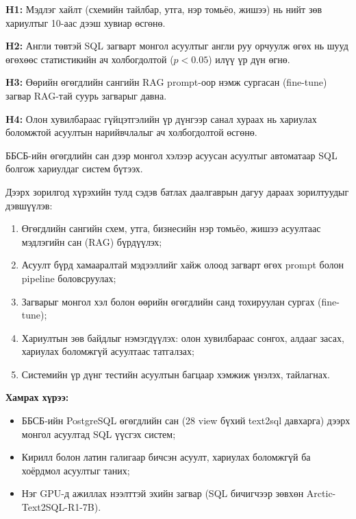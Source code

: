 \label{sec:hypothesis}

\textbf{H1:} Мэдлэг хайлт (схемийн тайлбар, утга, нэр томьёо, жишээ) нь нийт зөв хариултыг 10-аас дээш хувиар өсгөнө.

\textbf{H2:} Англи төвтэй SQL загварт монгол асуултыг англи руу орчуулж өгөх нь шууд өгөхөөс статистикийн ач
холбогдолтой ($p < 0.05$) илүү үр дүн өгнө.

\textbf{H3:} Өөрийн өгөгдлийн сангийн RAG prompt-оор нэмж сургасан (fine-tune) загвар RAG-тай суурь загварыг давна.

\textbf{H4:} Олон хувилбараас гүйцэтгэлийн үр дүнгээр санал хураах нь хариулах боломжтой асуултын нарийвчлалыг ач
холбогдолтой өсгөнө.

\label{sec:goal}

ББСБ-ийн өгөгдлийн сан дээр монгол хэлээр асуусан асуултыг автоматаар SQL болгож хариулдаг систем бүтээх.


Дээрх зорилгод хүрэхийн тулд сэдэв батлах даалгаврын дагуу дараах зорилтуудыг дэвшүүлэв:
\begin{enumerate}
  \item Өгөгдлийн сангийн схем, утга, бизнесийн нэр томьёо, жишээ асуултаас мэдлэгийн сан (RAG) бүрдүүлэх;
  \item Асуулт бүрд хамааралтай мэдээллийг хайж олоод загварт өгөх prompt болон pipeline боловсруулах;
  \item Загварыг монгол хэл болон өөрийн өгөгдлийн санд тохируулан сургах (fine-tune);
  \item Хариултын зөв байдлыг нэмэгдүүлэх: олон хувилбараас сонгох, алдааг засах, хариулах боломжгүй асуултаас татгалзах;
  \item Системийн үр дүнг тестийн асуултын багцаар хэмжиж үнэлэх, тайлагнах.
\end{enumerate}

\label{sec:scope}

\textbf{Хамрах хүрээ:}
\begin{itemize}
  \item ББСБ-ийн PostgreSQL өгөгдлийн сан (28 view бүхий text2sql давхарга) дээрх монгол асуултад SQL үүсгэх систем;
  \item Кирилл болон латин галигаар бичсэн асуулт, хариулах боломжгүй ба хоёрдмол асуултыг таних;
  \item Нэг GPU-д ажиллах нээлттэй эхийн загвар (SQL бичигчээр зөвхөн Arctic-Text2SQL-R1-7B).
\end{itemize}

